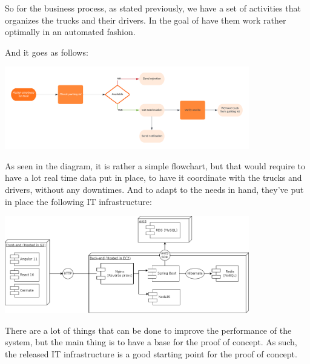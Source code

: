 So for the business process, as stated previously, we have a set of activities that organizes the trucks and their drivers.
In the goal of have them work rather optimally in an automated fashion.

And it goes as follows:

\begin{center}
    \includegraphics[width=0.8\textwidth]{images/flowchart}
\end{center}

As seen in the diagram, it is rather a simple flowchart, but that would require to have a lot real time data put in place,
to have it coordinate with the trucks and drivers, without any downtimes.
And to adapt to the needs in hand, they've put in place the following IT infrastructure:

\begin{center}
    \includegraphics[width=0.8\textwidth]{images/State-of-art}
\end{center}

There are a lot of things that can be done to improve the performance of the system, but the main thing is to have a
base for the proof of concept.
As such, the released IT infrastructure is a good starting point for the proof of concept.